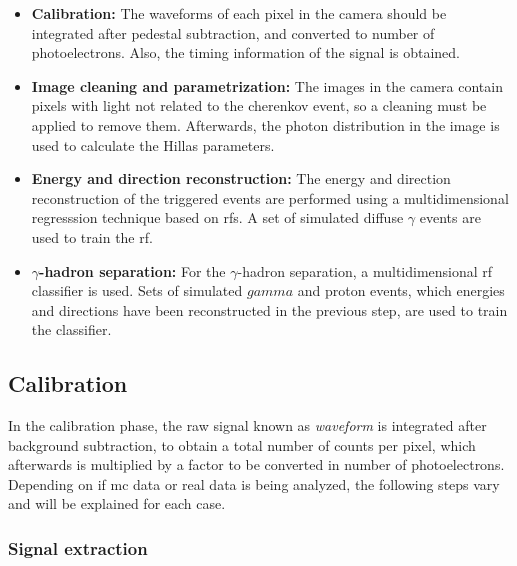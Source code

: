 \documentclass[main.tex]{subfiles}
\begin{document}
\begin{itemize}
\item\textbf{Calibration:} The waveforms of each pixel in the camera should be integrated after pedestal subtraction, and converted to number of photoelectrons. Also, the timing information of the signal is obtained. 
\item\textbf{Image cleaning and parametrization:} The images in the camera contain pixels with light not related to the cherenkov event, so a cleaning must be applied to remove them. Afterwards, the photon distribution in the image is used to calculate the Hillas parameters.
\item\textbf{Energy and direction reconstruction:} The energy and direction reconstruction of the triggered events are performed using a multidimensional regresssion technique based on \glspl{rf}. A set of simulated diffuse $\gamma$ events are used to train the \gls{rf}. 
\item\textbf{$\gamma$-hadron separation:} For the $\gamma$-hadron separation, a multidimensional \gls{rf} classifier is used. Sets of simulated $gamma$ and proton events, which energies and directions have been reconstructed in the previous step, are used to train the classifier.
\end{itemize}

\subsection{Calibration}

In the calibration phase, the raw signal known as \textit{waveform} is integrated after background subtraction, to obtain a total number of counts per pixel, which afterwards is multiplied by a factor to be converted in number of photoelectrons. Depending on if \gls{mc} data or real data is being analyzed, the following steps vary and will be explained for each case.

\subsubsection{Signal extraction}
\end{document}
